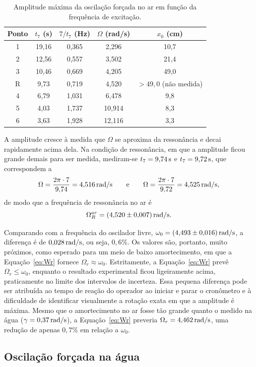 \begin{table}[H]
\centering
\caption{Amplitude máxima da oscilação forçada no ar em função da frequência de excitação.}
\label{tab:forcada_ar}
\begin{tabular}{ccccc}
\toprule
Ponto & $t_7$ (s) & $7/t_7$ (Hz) & $\Omega$ (rad/s) & $x_0$ (cm) \\
\midrule
1 & 19,16 & 0,365 & 2,296 & 10,7 \\
2 & 12,56 & 0,557 & 3,502 & 21,4 \\
3 & 10,46 & 0,669 & 4,205 & 49,0 \\
R & 9,73 & 0,719 & 4,520 & $>49{,}0$ (não medida) \\
4 & 6,79 & 1,031 & 6,478 & 9,8 \\
5 & 4,03 & 1,737 & 10,914 & 8,3 \\
6 & 3,63 & 1,928 & 12,116 & 3,3 \\
\bottomrule
\end{tabular}
\end{table}

A amplitude cresce à medida que $\Omega$ se aproxima da ressonância e decai rapidamente acima dela. Na condição de ressonância, em que a amplitude ficou grande demais para ser medida, mediram-se $t_7=9{,}74\,\mathrm{s}$ e $t_7=9{,}72\,\mathrm{s}$, que correspondem a
\[
\Omega=\frac{2\pi\cdot7}{9{,}74}=4{,}516\,\mathrm{rad/s}
\qquad\text{e}\qquad
\Omega=\frac{2\pi\cdot7}{9{,}72}=4{,}525\,\mathrm{rad/s},
\]
de modo que a frequência de ressonância no ar é
\[
\Omega_R^{ar}=(4{,}520\pm0{,}007)\,\mathrm{rad/s}.
\]

Comparando com a frequência do oscilador livre, $\omega_0=(4{,}493\pm0{,}016)\,\mathrm{rad/s}$, a diferença é de $0{,}028\,\mathrm{rad/s}$, ou seja, $0{,}6\%$. Os valores são, portanto, muito próximos, como esperado para um meio de baixo amortecimento, em que a Equação~\eqref{eq:Wr} fornece $\Omega_r\approx\omega_0$. Estritamente, a Equação~\eqref{eq:Wr} prevê $\Omega_r\le\omega_0$, enquanto o resultado experimental ficou ligeiramente acima, praticamente no limite dos intervalos de incerteza. Essa pequena diferença pode ser atribuída ao tempo de reação do operador ao iniciar e parar o cronômetro e à dificuldade de identificar visualmente a rotação exata em que a amplitude é máxima. Mesmo que o amortecimento no ar fosse tão grande quanto o medido na água ($\gamma=0{,}37\,\mathrm{rad/s}$), a Equação~\eqref{eq:Wr} preveria $\Omega_r=4{,}462\,\mathrm{rad/s}$, uma redução de apenas $0{,}7\%$ em relação a $\omega_0$.

\subsection{Oscilação forçada na água}

